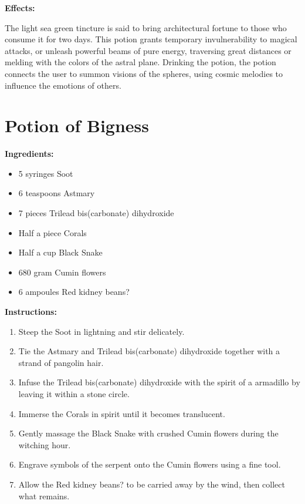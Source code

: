 \documentclass{article}
\begin{document}
\textbf{Effects:}

The light sea green tincture is said to bring architectural fortune to those who consume it for two days. This potion grants temporary invulnerability to magical attacks, or unleash powerful beams of pure energy, traversing great distances or melding with the colors of the astral plane. Drinking the potion, the potion connects the user to summon visions of the spheres, using cosmic melodies to influence the emotions of others.

\newpage
\section*{Potion of Bigness}

\textbf{Ingredients:}

\begin{itemize}
  \item 5 syringes Soot
  \item 6 teaspoons Astmary
  \item 7 pieces Trilead bis(carbonate) dihydroxide
  \item Half a piece Corals
  \item Half a cup Black Snake
  \item 680 gram Cumin flowers
  \item 6 ampoules Red kidney beans?
\end{itemize}

\textbf{Instructions:}

\begin{enumerate}
  \item Steep the Soot in lightning and stir delicately.
  \item Tie the Astmary and Trilead bis(carbonate) dihydroxide together with a strand of pangolin hair.
  \item Infuse the Trilead bis(carbonate) dihydroxide with the spirit of a armadillo by leaving it within a stone circle.
  \item Immerse the Corals in spirit until it becomes translucent.
  \item Gently massage the Black Snake with crushed Cumin flowers during the witching hour.
  \item Engrave symbols of the serpent onto the Cumin flowers using a fine tool.
  \item Allow the Red kidney beans? to be carried away by the wind, then collect what remains.
\end{enumerate}
\end{document}
